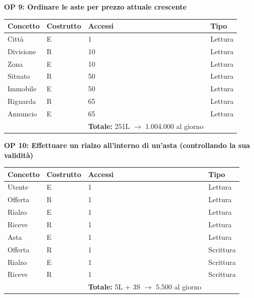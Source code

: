 \documentclass[a4paper,12pt]{report}
\begin{document}
            \noindent
            \textbf{OP 9: Ordinare le aste per prezzo attuale crescente}
        	\begin{table}[H]
            \centering
             \begin{tabular}{llll}
             \rowcolor{yellow!20} \textbf{Concetto} & \textbf{Costrutto} & \textbf{Accessi} & \textbf{Tipo}\\ [0.5ex] 
             \hline
             Città & E & 1 & Lettura \\ 
             Divisione & R & 10 & Lettura \\ 
             Zona & E & 10 & Lettura \\ 
             Situato & R & 50 & Lettura \\ 
             Immobile & E & 50 & Lettura \\ 
             Riguarda & R & 65 & Lettura \\ 
             Annuncio & E & 65 & Lettura \\ 
             \hline
                \rowcolor{yellow!20} &   & \textbf{Totale:} 251L $\rightarrow$ 1.004.000 al giorno &  \\ [1ex] 
             
             \end{tabular}
            \end{table}

            \noindent
            \textbf{OP 10: Effettuare un rialzo all’interno di un’asta (controllando la sua validità)} \\
        	\begin{table}[H]
            \centering
             \begin{tabular}{llll}
             \rowcolor{yellow!20} \textbf{Concetto} & \textbf{Costrutto} & \textbf{Accessi} & \textbf{Tipo}\\ [0.5ex] 
             \hline
             Utente & E & 1 & Lettura \\ 
             Offerta & R & 1 & Lettura \\ 
             Rialzo & E & 1 & Lettura \\ 
             Riceve & R & 1 & Lettura \\ 
             Asta & E & 1 & Lettura \\ 
             Offerta & R & 1 & Scrittura \\ 
             Rialzo & E & 1 & Scrittura \\ 
             Riceve & R & 1 & Scrittura \\ 
             \hline
                \rowcolor{yellow!20} &   & \textbf{Totale:} 5L + 3S $\rightarrow$ 5.500 al giorno &  \\ [1ex] 
             
             \end{tabular}
            \end{table}
\end{document}
